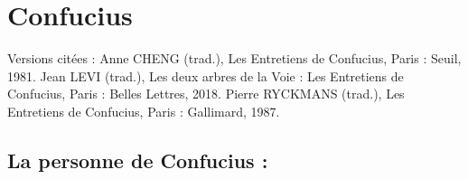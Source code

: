 \chapter{Confucius}  

Versions citées : Anne CHENG (trad.), Les Entretiens de Confucius, Paris : Seuil, 1981.  Jean LEVI (trad.), Les deux arbres de la Voie : Les Entretiens de Confucius, Paris : Belles Lettres, 2018.   Pierre RYCKMANS (trad.), Les Entretiens de Confucius, Paris : Gallimard, 1987.  

\section{La personne de Confucius : }

\begin{itemize}


\end{itemize}
